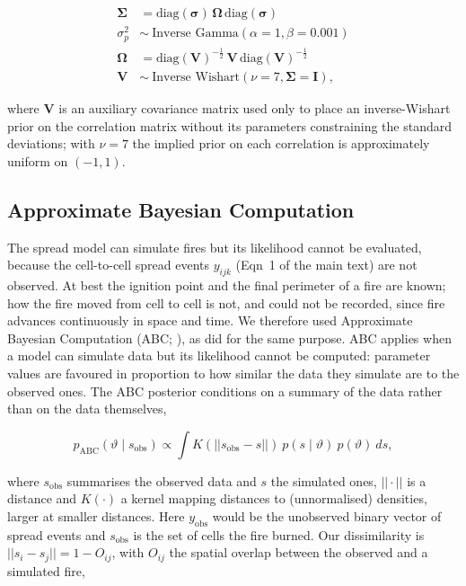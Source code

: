 \documentclass[11pt,a4paper]{article}
\begin{document}
\begin{equation}
\label{eq:hier2}
\begin{aligned}
    \boldsymbol{\Sigma} &= \text{diag}(\boldsymbol{\sigma}) \, \boldsymbol{\Omega} \, \text{diag}(\boldsymbol{\sigma}) \\
    \sigma_p^2 &\sim \ \text{Inverse Gamma}(\alpha = 1, \beta = 0.001) \\
    \boldsymbol{\Omega} &= \text{diag}(\boldsymbol{V})^{-\frac{1}{2}} \, \boldsymbol{V} \, \text{diag}(\boldsymbol{V})^{-\frac{1}{2}} \\
    \boldsymbol{V} &\sim \ \text{Inverse Wishart}(\nu = 7, \boldsymbol{\Sigma} = \boldsymbol{I}),
\end{aligned}
\end{equation}

\noindent where $\boldsymbol{V}$ is an auxiliary covariance matrix used only to place an
inverse-Wishart prior on the correlation matrix without its parameters constraining the
standard deviations; with $\nu = 7$ the implied prior on each correlation is
approximately uniform on $(-1, 1)$.

\subsection{Approximate Bayesian Computation}

The spread model can simulate fires but its likelihood cannot be evaluated, because the
cell-to-cell spread events $y_{ijk}$ (Eqn~1 of the main text) are not observed. At best
the ignition point and the final perimeter of a fire are known; how the fire moved from
cell to cell is not, and could not be recorded, since fire advances continuously in space
and time. We therefore used Approximate Bayesian Computation (ABC;
\citealt{beaumont2010approximate, sisson2018handbook}), as
\citet{morales_stochastic_2015} did for the same purpose. ABC applies when a model can
simulate data but its likelihood cannot be computed: parameter values are favoured in
proportion to how similar the data they simulate are to the observed ones. The ABC
posterior conditions on a summary of the data rather than on the data themselves,

\begin{equation}
\label{eq:abc}
p_{\mathrm{ABC}}(\vartheta \mid s_{\text{obs}}) \propto
\int K(||s_{\text{obs}} - s||) \ p(s \mid \vartheta) \ p(\vartheta) \ ds,
\end{equation}

\noindent where $s_{\text{obs}}$ summarises the observed data and $s$ the simulated ones,
$||\cdot||$ is a distance and $K(\cdot)$ a kernel mapping distances to (unnormalised)
densities, larger at smaller distances. Here $y_{\text{obs}}$ would be the unobserved
binary vector of spread events and $s_{\text{obs}}$ is the set of cells the fire burned.
Our dissimilarity is $||s_i - s_j|| = 1 - O_{ij}$, with $O_{ij}$ the spatial overlap
between the observed and a simulated fire,
\end{document}
